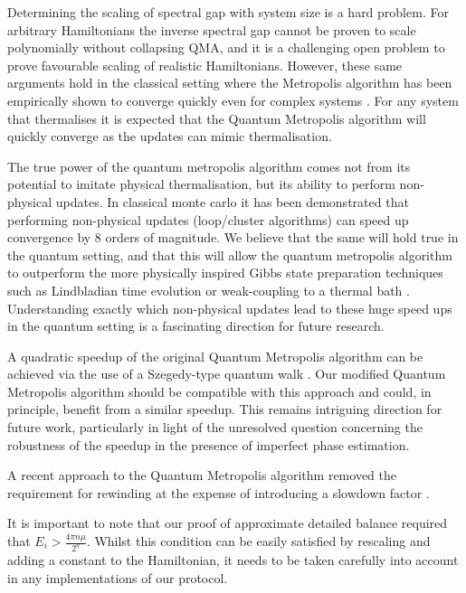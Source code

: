 \documentclass[aps,floatfix,10pt,amssymb,amsfont,amsmath,superscriptaddress,float,nofootinbib,longbibliography,nobalancelastpage,twocolumn]{revtex4-2}
\begin{document}
Determining the scaling of spectral gap with system size is a hard problem. For arbitrary Hamiltonians the inverse spectral gap cannot be proven to scale polynomially without collapsing QMA, and it is a challenging open problem to prove favourable scaling of realistic Hamiltonians. However, these same arguments hold in the classical setting where the Metropolis algorithm has been empirically shown to converge quickly even for complex systems \cite{}.  For any system that thermalises it is expected that the Quantum Metropolis algorithm will quickly converge as the updates can mimic thermalisation.

The true power of the quantum metropolis algorithm comes not from its potential to imitate physical thermalisation, but its ability to perform non-physical updates. In classical monte carlo it has been demonstrated \cite{todo2019parallel} that performing non-physical updates (loop/cluster algorithms) can speed up convergence by 8 orders of magnitude. We believe that the same will hold true in the quantum setting, and that this will allow the quantum metropolis algorithm to outperform the more physically inspired Gibbs state preparation techniques such as Lindbladian time evolution \cite{chen2023quantumthermalstatepreparation,rall2023thermal} or weak-coupling to a thermal bath \cite{chen2021fast,shtanko2021preparing}. Understanding exactly which non-physical updates lead to these huge speed ups in the quantum setting is a fascinating direction for future research.


A quadratic speedup \cite{} of the original Quantum Metropolis algorithm can be achieved via the use of a Szegedy-type quantum walk \cite{}. Our modified Quantum Metropolis algorithm should be compatible with this approach and could, in principle, benefit from a similar speedup. This remains intriguing direction for future work, particularly in light of the unresolved question concerning the robustness of the speedup in the presence of imperfect phase estimation. 

A recent approach to the Quantum Metropolis algorithm removed the requirement for rewinding at the expense of introducing a slowdown factor \cite{}.  

It is important to note that our proof of approximate detailed balance required that $E_i > \frac{4\pi n \mu}{2^{\eta}}$. Whilst this condition can be easily satisfied by rescaling and adding a constant to the Hamiltonian, it needs to be taken carefully into account in any implementations of our protocol.
\end{document}
